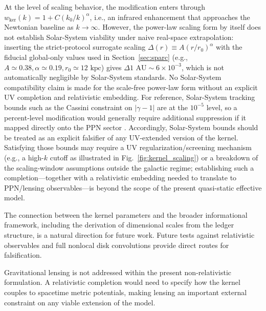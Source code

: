\documentclass[entropy,article,submit,pdftex,moreauthors]{Definitions/mdpi}
\begin{document}
At the level of scaling behavior, the modification enters through $w_{\mathrm{ker}}(k)=1+C(k_0/k)^\alpha$, i.e., an infrared enhancement that approaches the Newtonian baseline as $k \rightarrow \infty$. However, the power-law scaling form by itself does not establish Solar-System viability under naive real-space extrapolation: inserting the strict-protocol surrogate scaling $\Delta(r) \equiv A(r/r_0)^\alpha$ with the fiducial global-only values used in Section~\ref{sec:sparc} (e.g.,$A \simeq 0.38, \alpha \simeq 0.19, r_0 \simeq 12 \text{ kpc}$) gives $\Delta 1 \text{ AU} \sim 6 \times 10^{-3}$, which is not automatically negligible by Solar-System standards. No Solar-System compatibility claim is made for the scale-free power-law form without an explicit UV completion and relativistic embedding. For reference, Solar-System tracking bounds such as the Cassini constraint on $| \gamma -1 |$ are at the $10^{-5}$ level, so a percent-level modification would generally require additional suppression if it mapped directly onto the PPN sector \cite{Bertotti2003}. Accordingly, Solar-System bounds should be treated as an explicit falsifier of any UV-extended version of the kernel. Satisfying those bounds may require a UV regularization/screening mechanism (e.g., a high-$k$ cutoff as illustrated in Fig.~\ref{fig:kernel_scaling}) or a breakdown of the scaling-window assumptions outside the galactic regime; establishing such a completion—together with a relativistic embedding needed to translate to PPN/lensing observables—is beyond the scope of the present quasi-static effective model.

The connection between the kernel parameters and the broader informational framework, including the derivation of dimensional scales from the ledger structure, is a natural direction for future work. Future tests against relativistic observables and full nonlocal disk convolutions provide direct routes for falsification.

Gravitational lensing is not addressed within the present non-relativistic formulation. A relativistic completion would need to specify how the kernel couples to spacetime metric potentials, making lensing an important external constraint on any viable extension of the model.


\vspace{6pt} 

\end{document}
